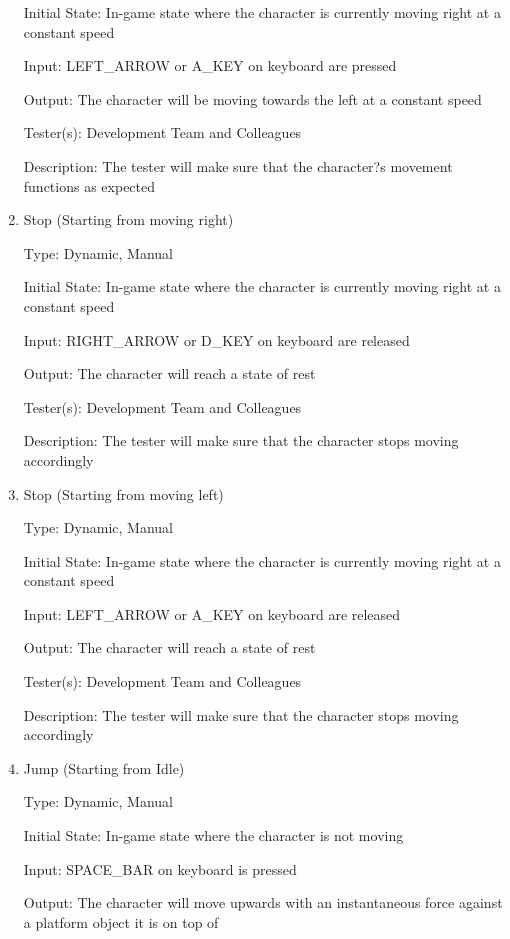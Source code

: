 \documentclass[12pt, titlepage]{article}
\begin{document}
\begin{enumerate}
Initial State: In-game state where the character is currently moving right at a constant speed

Input: LEFT\_ARROW or A\_KEY on keyboard are pressed

Output: The character will be moving towards the left at a constant speed

Tester(s): Development Team and Colleagues

Description: The tester will make sure that the character?s movement functions as expected

\item{Stop (Starting from moving right)\\}

Type: Dynamic, Manual

Initial State: In-game state where the character is currently moving right at a constant speed

Input: RIGHT\_ARROW or D\_KEY on keyboard are released

Output: The character will reach a state of rest

Tester(s): Development Team and Colleagues

Description: The tester will make sure that the character stops moving accordingly

\item{Stop (Starting from moving left)\\}

Type: Dynamic, Manual

Initial State: In-game state where the character is currently moving right at a constant speed

Input: LEFT\_ARROW or A\_KEY on keyboard are released

Output: The character will reach a state of rest

Tester(s): Development Team and Colleagues

Description: The tester will make sure that the character stops moving accordingly

\item{Jump (Starting from Idle)\\}

Type: Dynamic, Manual

Initial State: In-game state where the character is not moving

Input: SPACE\_BAR on keyboard is pressed

Output: The character will move upwards with an instantaneous force against a platform object it is on top of


\end{enumerate}
\end{document}
